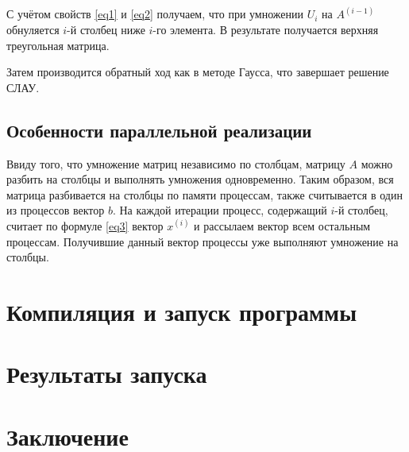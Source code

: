 \documentclass[oneside,final,14pt]{extreport}
\begin{document}
С учётом свойств \ref{eq1} и \ref{eq2} получаем, что при умножении $U_i$ на $A^{(i-1)}$ обнуляется $i$-й столбец ниже $i$-го элемента.
В результате получается верхняя треугольная матрица.

Затем производится обратный ход как в методе Гаусса, что завершает решение СЛАУ.

\subsection*{Особенности параллельной реализации}

Ввиду того, что умножение матриц независимо по столбцам, матрицу $A$ можно разбить на столбцы и выполнять умножения одновременно. Таким образом, вся матрица
разбивается на столбцы по памяти процессам, также считывается в один из процессов вектор $b$. На каждой итерации процесс, содержащий $i$-й столбец, 
считает по формуле \ref{eq3} вектор $x^{(i)}$ и рассылаем вектор всем остальным процессам. Получившие данный вектор процессы уже выполняют умножение на столбцы.

\section*{Компиляция и запуск программы}

\section*{Результаты запуска}

\section*{Заключение}
\end{document}
